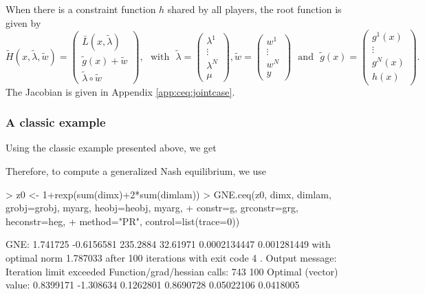\documentclass[11pt]{article}
\newcommand{\txtm}[1]{\textrm{~~#1~~}}
\begin{document}
When there is a constraint function $h$ shared by all players, the root function is given by
$$
\widetilde H(x, \tilde \lambda, \tilde w) = 
\left( 
\begin{matrix}
\bar L(x, \tilde \lambda) \\
\tilde g(x) + \tilde w \\
\tilde \lambda \circ \tilde w 
\end{matrix}
\right) ,
\txtm{with}
\tilde \lambda = 
\left( 
\begin{matrix}
\lambda^1 \\
\vdots \\
\lambda^N \\
\mu
\end{matrix}
\right) 
,
\tilde w = 
\left( 
\begin{matrix}
w^1 \\
\vdots \\
w^N \\
y
\end{matrix}
\right) 
\txtm{and}
\tilde g(x) = 
\left( 
\begin{matrix}
g^1(x) \\
\vdots \\
g^N(x) \\
h(x)
\end{matrix}
\right) .
$$
The Jacobian is given in Appendix \ref{app:ceq:jointcase}.





\subsubsection{A classic example}
Using the classic example presented above, we get

Therefore, to compute a generalized Nash equilibrium, we use
\begin{Schunk}
\begin{Sinput}
> z0 <- 1+rexp(sum(dimx)+2*sum(dimlam))
> GNE.ceq(z0, dimx, dimlam, grobj=grobj, myarg, heobj=heobj, myarg, 
+ 	constr=g, grconstr=grg, heconstr=heg, 
+ 	method="PR", control=list(trace=0))
\end{Sinput}
\begin{Soutput}
GNE: 1.741725 -0.6156581 235.2884 32.61971 0.0002134447 0.001281449 
with optimal norm 1.787033 
after  100 iterations with exit code 4 .
Output message: Iteration limit exceeded 
Function/grad/hessian calls: 743 100 
Optimal (vector) value: 0.8399171 -1.308634 0.1262801 0.8690728 0.05022106 0.0418005 
\end{Soutput}
\end{Schunk}
\end{document}

